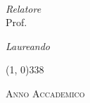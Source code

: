 \begin{titlepage}
\begin{center}
\vspace{10pt}
\begin{large}
\textsl{\myDegree}\\
\end{large}
\vspace{40pt}
\begin{large}
\begin{flushleft}
\textit{Relatore}\\
\vspace{5pt}
Prof. \myProf
\end{flushleft}
\vspace{0pt}
\begin{flushright}
\textit{Laureando}\\
\vspace{5pt}
\myName
\end{flushright}
\end{large}
\vspace{40pt}
\line(1, 0){338} \\
\begin{normalsize}
\textsc{Anno Accademico \myAA}
\end{normalsize}

\end{center}
\end{titlepage}
